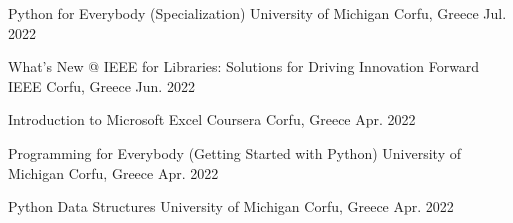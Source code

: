 \begin{cventries}

  \cventry
    {Python for Everybody (Specialization)} %
    {University of Michigan} %
    {Corfu, Greece} %
    {Jul. 2022} %
    {
      \begin{cvitems} %
      \end{cvitems}
    }


  \cventry
    {What's New @ IEEE for Libraries: Solutions for Driving Innovation Forward} %
    {IEEE} %
    {Corfu, Greece} %
    {Jun. 2022} %
    {
      \begin{cvitems} %
      \end{cvitems}
    }


  \cventry
    {Introduction to Microsoft Excel} %
    {Coursera} %
    {Corfu, Greece} %
    {Apr. 2022} %
    {
      \begin{cvitems} %
      \end{cvitems}
    }


  \cventry
    {Programming for Everybody (Getting Started with Python)} %
    {University of Michigan} %
    {Corfu, Greece} %
    {Apr. 2022} %
    {
      \begin{cvitems} %
      \end{cvitems}
    }


  \cventry
    {Python Data Structures} %
    {University of Michigan} %
    {Corfu, Greece} %
    {Apr. 2022} %
    {
      \begin{cvitems} %
      \end{cvitems}
    }


\end{cventries}
